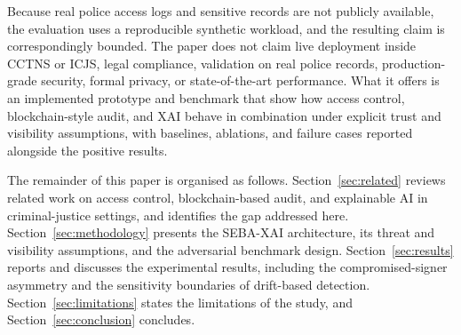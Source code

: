 Because real police access logs and sensitive records are not publicly
available, the evaluation uses a reproducible synthetic workload, and the
resulting claim is correspondingly bounded. The paper does not claim live
deployment inside CCTNS or ICJS, legal compliance, validation on real police
records, production-grade security, formal privacy, or state-of-the-art
performance. What it offers is an implemented prototype and benchmark that show
how access control, blockchain-style audit, and XAI behave in combination under
explicit trust and visibility assumptions, with baselines, ablations, and
failure cases reported alongside the positive results.

The remainder of this paper is organised as follows. Section~\ref{sec:related}
reviews related work on access control, blockchain-based audit, and explainable
AI in criminal-justice settings, and identifies the gap addressed here.
Section~\ref{sec:methodology} presents the SEBA-XAI architecture, its threat
and visibility assumptions, and the adversarial benchmark design.
Section~\ref{sec:results} reports and discusses the experimental results,
including the compromised-signer asymmetry and the sensitivity boundaries of
drift-based detection. Section~\ref{sec:limitations} states the limitations of
the study, and Section~\ref{sec:conclusion} concludes.
